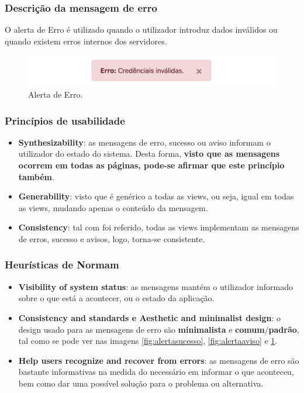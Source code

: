 \subsubsection{Descrição da mensagem de erro}
\hspace{5mm} O alerta de Erro é utilizado quando o utilizador introduz dados inválidos ou quando existem erros internos dos servidores.

\begin{figure}[H]
    \centering
    \includegraphics[scale=0.45]{images/alerts/alerta_erro.png}
    \caption{Alerta de Erro.}
    \label{fig:alertaerro}
\end{figure}

\subsubsection{Princípios de usabilidade}
\begin{itemize}
    \item \textbf{Synthesizability}: as mensagens de erro, sucesso ou aviso informam o utilizador do estado do sistema. Desta forma, \textbf{visto que as mensagens ocorrem em todas as páginas, pode-se afirmar que este princípio também}.
    \item \textbf{Generability}: visto que é genérico a todas as views, ou seja, igual em todas as views, mudando apenas o conteúdo da mensagem.
    \item \textbf{Consistency}: tal com foi referido, todas as views implementam as mensagens de erros, sucesso e avisos, logo, torna-se consistente.
\end{itemize}

\subsubsection{Heurísticas de Normam}
\begin{itemize}
    \item \textbf{Visibility of system status}: as mensagens mantém o utilizador informado sobre o que está a acontecer, ou o estado da aplicação.
    \item \textbf{Consistency and standards e Aesthetic and minimalist design}: o design usado para as mensagens de erro são \textbf{minimalista} e \textbf{comum}/\textbf{padrão}, tal como se pode ver nas imagens \ref{fig:alertasucesso}, \ref{fig:alertaaviso} e \ref{fig:alertaerro}.
    \item \textbf{Help users recognize and recover from errors}: as mensagens de erro são bastante informativas na medida do necessário em informar o que aconteceu, bem como dar uma possível solução para o problema ou alternativa.
\end{itemize}


